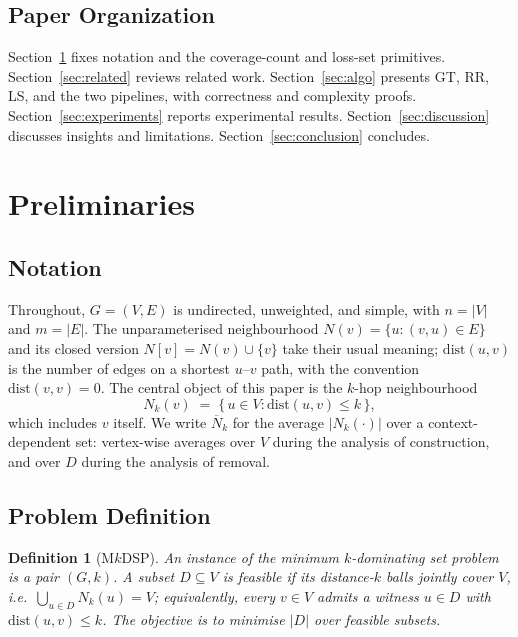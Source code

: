 \documentclass[11pt,a4paper]{article}
\newtheorem{definition}[theorem]{Definition}
\newcommand{\Nk}{\overline{N}_k}
\begin{document}
\subsection{Paper Organization}

Section~\ref{sec:prelim} fixes notation and the coverage-count and
loss-set primitives. Section~\ref{sec:related} reviews related work.
Section~\ref{sec:algo} presents GT, RR, LS, and the two pipelines, with
correctness and complexity proofs. Section~\ref{sec:experiments} reports
experimental results. Section~\ref{sec:discussion} discusses insights and
limitations. Section~\ref{sec:conclusion} concludes.


\section{Preliminaries}
\label{sec:prelim}

\subsection{Notation}

Throughout, $G=(V,E)$ is undirected, unweighted, and simple, with
$n=|V|$ and $m=|E|$. The unparameterised neighbourhood
$N(v)=\{u:(v,u)\in E\}$ and its closed version $N[v]=N(v)\cup\{v\}$
take their usual meaning; $\mathrm{dist}(u,v)$ is the number of edges
on a shortest $u$--$v$ path, with the convention $\mathrm{dist}(v,v)=0$.
The central object of this paper is the $k$-hop neighbourhood
\[
  N_k(v) \;=\; \{\,u\in V:\mathrm{dist}(u,v)\le k\,\},
\]
which includes $v$ itself. We write $\Nk$ for the average
$|N_k(\cdot)|$ over a context-dependent set: vertex-wise averages over
$V$ during the analysis of construction, and over $D$ during the
analysis of removal.

\subsection{Problem Definition}

\begin{definition}[M$k$DSP]
\label{def:mkdsp}
An instance of the \emph{minimum $k$-dominating set problem} is a pair
$(G,k)$. A subset $D\subseteq V$ is feasible if its distance-$k$ balls
jointly cover $V$, i.e.\ $\bigcup_{u\in D}N_k(u)=V$; equivalently, every
$v\in V$ admits a witness $u\in D$ with $\mathrm{dist}(u,v)\le k$.
The objective is to minimise $|D|$ over feasible subsets.
\end{definition}
\end{document}
